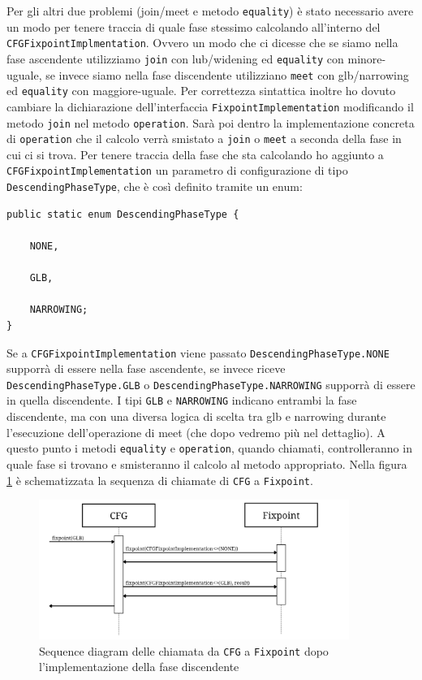 Per gli altri due problemi (join/meet e metodo \texttt{equality}) è stato necessario avere un modo per tenere traccia di quale fase stessimo calcolando all'interno del \texttt{CFGFixpointImplmentation}. Ovvero un modo che ci dicesse che se siamo nella fase ascendente utilizziamo \texttt{join} con lub/widening ed \texttt{equality} con minore-uguale, se invece siamo nella fase discendente utilizziano \texttt{meet} con glb/narrowing ed \texttt{equality} con maggiore-uguale. Per correttezza sintattica inoltre ho dovuto cambiare la dichiarazione dell'interfaccia \texttt{FixpointImplementation} modificando il metodo \texttt{join} nel metodo \texttt{operation}. Sarà poi dentro la implementazione concreta di \texttt{operation} che il calcolo verrà smistato a \texttt{join} o \texttt{meet} a seconda della fase in cui ci si trova. Per tenere traccia della fase che sta calcolando ho aggiunto a \texttt{CFGFixpointImplementation} un parametro di configurazione di tipo \texttt{DescendingPhaseType}, che è così definito tramite un enum:  
\begin{lstlisting}[belowskip=-1.1 \baselineskip, escapechar=|]
public static enum DescendingPhaseType {

    NONE,
    
    GLB,
    
    NARROWING;
}
\end{lstlisting}
Se a \texttt{CFGFixpointImplementation} viene passato \texttt{DescendingPhaseType.NONE} supporrà di essere nella fase ascendente, se invece riceve \texttt{DescendingPhaseType.GLB} o \texttt{DescendingPhaseType.NARROWING} supporrà di essere in quella discendente. I tipi \texttt{GLB} e \texttt{NARROWING} indicano entrambi la fase discendente, ma con una diversa logica di scelta tra glb e narrowing durante l'esecuzione dell'operazione di meet (che dopo vedremo più nel dettaglio). A questo punto i metodi \texttt{equality} e \texttt{operation}, quando chiamati, controlleranno in quale fase si trovano e smisteranno il calcolo al metodo appropriato. Nella figura \ref{fig:flowFaseDisc} è schematizzata la sequenza di chiamate di \texttt{CFG} a \texttt{Fixpoint}.

\begin{figure}
	\centering
	\includegraphics[width=0.9\textwidth]{Immagini/flowFaseDisc.png}
	\caption{Sequence diagram delle chiamata da \texttt{CFG} a \texttt{Fixpoint} dopo l'implementazione della fase discendente}
	\label{fig:flowFaseDisc}
\end{figure}

